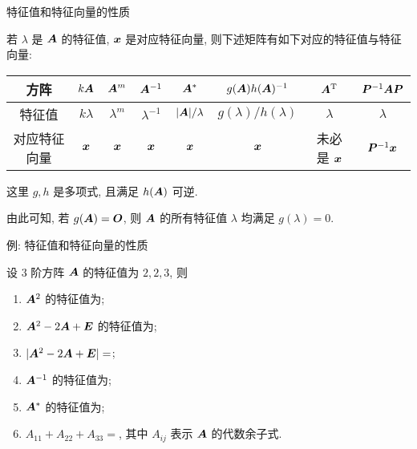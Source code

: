 \begin{frame}{特征值和特征向量的性质}
	\onslide<+->
	\begin{theorem}
		若 $\lambda$ 是 ${\boldsymbol{A}}$ 的特征值, ${\boldsymbol{x}}$ 是对应特征向量, 则下述矩阵有如下对应的特征值与特征向量:
		\begin{center}
			\begin{tabular}{cccccccc} \toprule
				方阵 & $k{\boldsymbol{A}}$ & ${\boldsymbol{A}}^m$ & ${\boldsymbol{A}}^{-1}$ & ${\boldsymbol{A}}^*$ & $g({\boldsymbol{A}})h({\boldsymbol{A}})^{-1}$ & ${\boldsymbol{A}}^{\mathrm{T}}$ & ${\boldsymbol{P}}^{-1}{\boldsymbol{A}}{\boldsymbol{P}}$\\ \midrule
				特征值&$k\lambda$&$\lambda^m$&$\lambda^{-1}$&$|{\boldsymbol{A}}|/\lambda$&$g(\lambda)/h(\lambda)$&$\lambda$&$\lambda$\\ \midrule
				对应特征向量&${\boldsymbol{x}}$&${\boldsymbol{x}}$&${\boldsymbol{x}}$&${\boldsymbol{x}}$&${\boldsymbol{x}}$&\alert{未必是 ${\boldsymbol{x}}$}&\alert{${\boldsymbol{P}}^{-1}{\boldsymbol{x}}$}\\
				\bottomrule
			\end{tabular}
		\end{center}
		这里 $g,h$ 是多项式, 且满足 $h({\boldsymbol{A}})$ 可逆.
	\end{theorem}
	\onslide<+->
	由此可知, 若 $g({\boldsymbol{A}})={\boldsymbol{O}}$, 则 ${\boldsymbol{A}}$ 的所有特征值 $\lambda$ 均满足 $g(\lambda)=0$.
\end{frame}


\begin{frame}{例: 特征值和特征向量的性质}
	\onslide<+->
	\begin{example}
		设 $3$ 阶方阵 ${\boldsymbol{A}}$ 的特征值为 $2,2,3$, 则
		\begin{enumerate}
			\item ${\boldsymbol{A}}^2$ 的特征值为;
			\item ${\boldsymbol{A}}^2-2{\boldsymbol{A}}+{\boldsymbol{E}}$ 的特征值为;
			\item $|{\boldsymbol{A}}^2-2{\boldsymbol{A}}+{\boldsymbol{E}}|=$;
			\item ${\boldsymbol{A}}^{-1}$ 的特征值为;
			\item ${\boldsymbol{A}}^*$ 的特征值为;
			\item $A_{11}+A_{22}+A_{33}=$, 其中 $A_{ij}$ 表示 ${\boldsymbol{A}}$ 的代数余子式.
		\end{enumerate}
	\end{example}
\end{frame}


